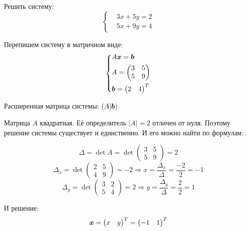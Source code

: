 \documentclass[a4paper,12pt]{article}
\begin{document}
  
  \begin{problem}[17.1(2)]
    Решить систему:
    \[
      \left\{
        \begin{aligned}
          &3x + 5y = 2\\
          &5x + 9y = 4
        \end{aligned}
      \right.
    \]
  \end{problem}
  
  \begin{solution}
    Перепишем систему в матричном виде:
    \[
      \left\{
        \begin{aligned}
          &A \boldsymbol x = \boldsymbol b\\
          &A = \begin{pmatrix}
            3 & 5\\
            5 & 9
          \end{pmatrix}\\
          &\boldsymbol b = \begin{pmatrix}
            2 & 4
          \end{pmatrix}^T
        \end{aligned}
      \right.
    \]
    
    Расширенная матрица системы: $(A | \boldsymbol b)$.
    
    Матрица $A$ квадратная.
    Её определитель $|A| = 2$ отличен от нуля.
    Поэтому решение системы существует и единственно.
    И его можно найти по формулам:
    
    \[
      \Delta = \det A = \det \begin{pmatrix}
        3 & 5\\
        5 & 9
      \end{pmatrix} = 2
    \]
    \[
      \Delta_x = \det \begin{pmatrix}
        2 & 5\\
        4 & 9
      \end{pmatrix} = -2 \Rightarrow x = \frac{\Delta_x}{\Delta} = \frac{-2}{2} = -1
    \]
    \[
      \Delta_y = \det \begin{pmatrix}
        3 & 2\\
        5 & 4
      \end{pmatrix} = 2 \Rightarrow y = \frac{\Delta_y}{\Delta} = \frac{2}{2} = 1
    \]
    
    И решение:
    \[
      \boldsymbol x = \begin{pmatrix}
        x & y
      \end{pmatrix}^T = \begin{pmatrix}
        -1 & 1
      \end{pmatrix}^T
    \]
  \end{solution}
  
\end{document}
